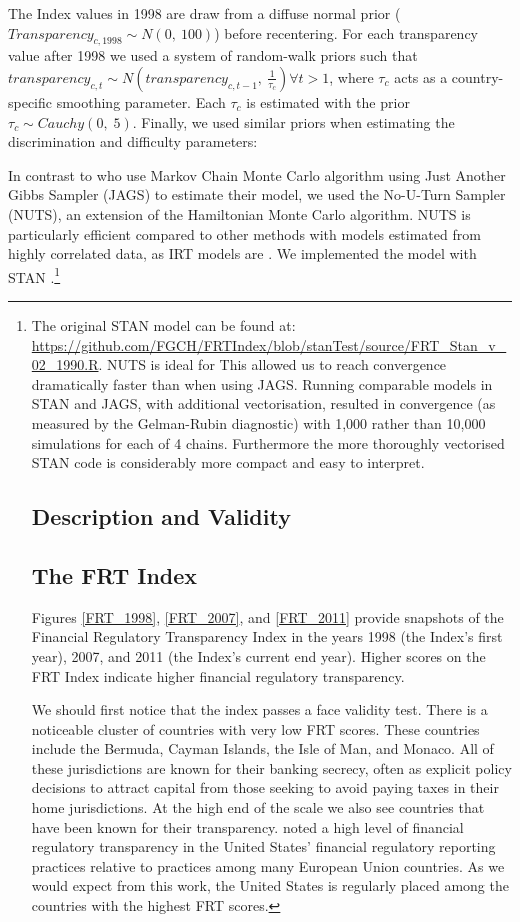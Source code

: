 \documentclass[a4paper]{article}
\begin{document}
The Index values in 1998 are draw from a diffuse normal prior ($Transparency_{c,1998} \sim N(0,\:100)$) before recentering. For each transparency value after 1998 we used a system of random-walk priors such that $transparency_{c,t} \sim N(transparency_{c,t-1},\: \frac{1}{\tau_{c}}) \forall t > 1$, where $\tau_{c}$ acts as a country-specific smoothing parameter. Each $\tau_{c}$ is estimated with the prior $\tau_{c} \sim Cauchy(0,\;5)$. Finally, we used similar priors when estimating the discrimination and difficulty parameters:

In contrast to \cite{Hollyer2014} who use Markov Chain Monte Carlo algorithm using Just Another Gibbs Sampler (JAGS) to estimate their model, we used the No-U-Turn Sampler (NUTS), an extension of the Hamiltonian Monte Carlo algorithm. NUTS is particularly efficient compared to other methods with models estimated from highly correlated data, as IRT models are \citep{hoffmangelman2013}. We implemented the model with STAN \citep{stan-manual:2014}.\footnote{The original STAN model can be found at: \url{https://github.com/FGCH/FRTIndex/blob/stanTest/source/FRT_Stan_v_02_1990.R}. NUTS is ideal for  This allowed us to reach convergence dramatically faster than when using JAGS. Running comparable models in STAN and JAGS, with additional vectorisation, resulted in convergence (as measured by the Gelman-Rubin diagnostic) with 1,000 rather than 10,000 simulations for each of 4 chains. Furthermore the more thoroughly vectorised STAN code is considerably more compact and easy to interpret.

\section{Description and Validity}


\subsection{The FRT Index}

Figures \ref{FRT_1998}, \ref{FRT_2007}, and \ref{FRT_2011} provide snapshots of the Financial Regulatory Transparency Index in the years 1998 (the Index's first year), 2007, and 2011 (the Index's current end year). Higher scores on the FRT Index indicate higher financial regulatory transparency.

We should first notice that the index passes a face validity test. There is a noticeable cluster of countries with very low FRT scores. These countries include the Bermuda, Cayman Islands, the Isle of Man, and Monaco. All of these jurisdictions are known for their banking secrecy, often as explicit policy decisions to attract capital from those seeking to avoid paying taxes in their home jurisdictions. At the high end of the scale we also see countries that have been known for their transparency. \cite{Gandrud2014a} noted a high level of financial regulatory transparency in the United States' financial regulatory reporting practices relative to practices among many European Union countries. As we would expect from this work, the United States is regularly placed among the countries with the highest FRT scores.

}
\end{document}
